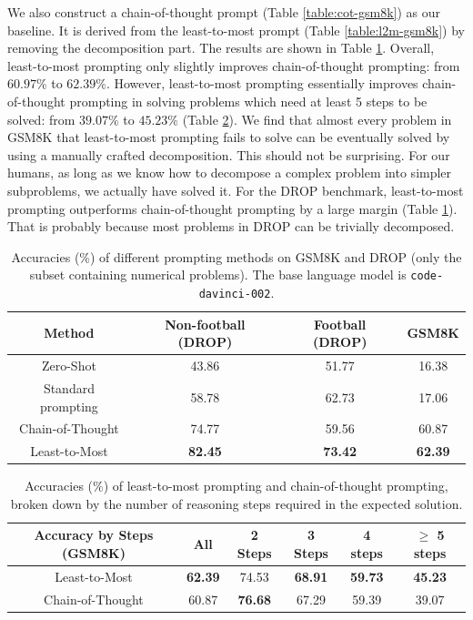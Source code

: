 \documentclass{article}
\begin{document}
We also construct a chain-of-thought prompt (Table \ref{table:cot-gsm8k}) as our baseline. It is derived from the least-to-most prompt (Table \ref{table:l2m-gsm8k}) by removing the decomposition part. The results are shown in Table \ref{table:drop-results}. Overall, least-to-most prompting only slightly improves chain-of-thought prompting: from $60.97\%$ to $62.39\%.$ However, least-to-most prompting essentially improves chain-of-thought prompting in solving problems which need at least 5 steps to be solved: from $39.07\%$ to $45.23\%$ (Table \ref{table:gsm8k-main-tex}). We find that almost every problem in GSM8K that least-to-most prompting fails to solve can be eventually solved by using a manually crafted decomposition. This should not be surprising. For our humans, as long as we know how to decompose a complex problem into simpler subproblems, we actually have solved it.  For the DROP benchmark, least-to-most prompting outperforms chain-of-thought prompting by a large margin (Table \ref{table:drop-results}). That is probably because most problems in DROP can be trivially decomposed.






\begin{table}[h!]
\centering
\begin{tabular}{ c|ccc}
  \hline
  {Method} & {Non-football (DROP)} & {Football (DROP)} & {GSM8K}  \\
  \hline
  Zero-Shot & 43.86 & 51.77 & 16.38\\ 
  Standard prompting  & 58.78 & 62.73 & 17.06\\ 
  Chain-of-Thought & 74.77 & 59.56 &  60.87\\
  Least-to-Most & \textbf{82.45} & \textbf{73.42} &  \textbf{62.39}\\ 
  \hline
\end{tabular}
\vspace{5pt}
\caption{Accuracies (\%) of different prompting methods on GSM8K and DROP (only the subset containing numerical problems). The base language model is \texttt{code-davinci-002}. %
}
\label{table:drop-results}
\end{table}

\begin{table}[h!]
\centering
\begin{tabular}{ c|ccccc}
\hline
{Accuracy by Steps (GSM8K)} & {All} & {2 Steps} & {3 Steps} & {4 steps} & {$\ge$ 5 steps}  \\
 \hline
Least-to-Most& \textbf{62.39} & 74.53 & \textbf{68.91} & \textbf{59.73} & \textbf{45.23} \\
Chain-of-Thought& 60.87 & \textbf{76.68} & 67.29 & 59.39 & 39.07 \\
  \hline
\end{tabular}
\vspace{5pt}
\caption{Accuracies (\%) of least-to-most prompting and chain-of-thought prompting, broken down by the number of reasoning steps required in the expected solution.}
\label{table:gsm8k-main-tex}
\end{table}
\end{document}
